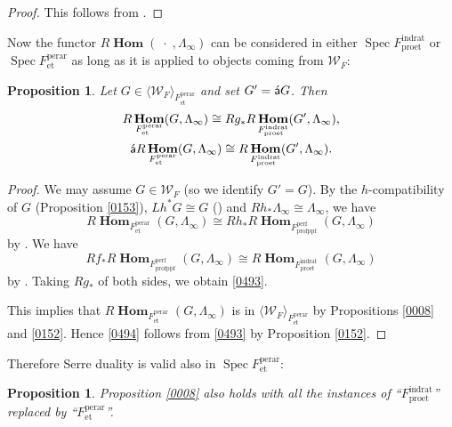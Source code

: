 \documentclass{amsart}
\newtheorem{Prop}[Thm]{Proposition}
\theoremstyle{remark}
\numberwithin{equation}{subsection}
\newcommand{\et}{\mathrm{et}}
\newcommand{\fppf}{\mathrm{fppf}}
\newcommand{\rat}{\mathrm{rat}}
\newcommand{\ind}{\mathrm{ind}}
\newcommand{\pro}{\mathrm{pro}}
\newcommand{\perf}{\mathrm{perf}}
\newcommand{\perar}{\mathrm{perar}}
\newcommand{\alg}[1]{\mathbf{#1}}
\newcommand{\var}{\;\cdot\;}
\newcommand{\algebrize}{\Acute{\mathsf{a}}}
\newcommand{\genby}[1]{\langle #1 \rangle}
\DeclareMathOperator{\Spec}{Spec}
\DeclareMathOperator{\sheafhom}{\alg{Hom}}
\begin{document}
\begin{proof}
	This follows from \cite[Proposition 2.4.1 (a), (b)]{Suz20}.
\end{proof}

Now the functor $R \sheafhom(\var, \Lambda_{\infty})$ can be considered
in either $\Spec F^{\ind\rat}_{\pro\et}$ or $\Spec F^{\perar}_{\et}$
as long as it is applied to objects coming from $\mathcal{W}_{F}$:

\begin{Prop} \label{0496}
	Let $G \in \genby{\mathcal{W}_{F}}_{F^{\perar}_{\et}}$
	and set $G' = \algebrize G$.
	Then
		\begin{gather} \label{0493}
					R \sheafhom_{F^{\perar}_{\et}}(G, \Lambda_{\infty})
				\cong
					R g_{\ast}
					R \sheafhom_{F^{\ind\rat}_{\pro\et}}(G', \Lambda_{\infty}),
			\\ \label{0494}
					\algebrize
					R \sheafhom_{F^{\perar}_{\et}}(G, \Lambda_{\infty})
				\cong
					R \sheafhom_{F^{\ind\rat}_{\pro\et}}(G', \Lambda_{\infty}).
		\end{gather}
\end{Prop}

\begin{proof}
	We may assume $G \in \mathcal{W}_{F}$ (so we identify $G' = G$).
	By the $h$-compatibility of $G$ (Proposition \ref{0153}),
	$L h^{\ast} G \cong G$ (\cite[Theorem 3.15]{Suz21}) and
	$R h_{\ast} \Lambda_{\infty} \cong \Lambda_{\infty}$,
	we have
		\[
				R \sheafhom_{F^{\perar}_{\et}}(G, \Lambda_{\infty})
			\cong
				R h_{\ast}
				R \sheafhom_{F^{\perf}_{\pro\fppf}}(G, \Lambda_{\infty})
		\]
	by \cite[Proposition 2.8]{Suz21}.
	We have
		\[
				R f_{\ast}
				R \sheafhom_{F^{\perf}_{\pro\fppf}}(G, \Lambda_{\infty})
			\cong
				R \sheafhom_{F^{\ind\rat}_{\pro\et}}(G, \Lambda_{\infty})
		\]
	by \cite[Theorem (2.3.1), Proposition (2.3.2)]{Suz20}.
	Taking $R g_{\ast}$ of both sides, we obtain \eqref{0493}.
	
	This implies that
	$R \sheafhom_{F^{\perar}_{\et}}(G, \Lambda_{\infty})$
	is in $\genby{\mathcal{W}_{F}}_{F^{\perar}_{\et}}$
	by Propositions \ref{0008} and \ref{0152}.
	Hence \eqref{0494} follows from \eqref{0493} by
	Proposition \ref{0152}.
\end{proof}

Therefore Serre duality is valid also in $\Spec F^{\perar}_{\et}$:

\begin{Prop} \label{0497}
	Proposition \ref{0008} also holds
	with all the instances of ``$F^{\ind\rat}_{\pro\et}$''
	replaced by ``$F^{\perar}_{\et}$''.
\end{Prop}
\end{document}

